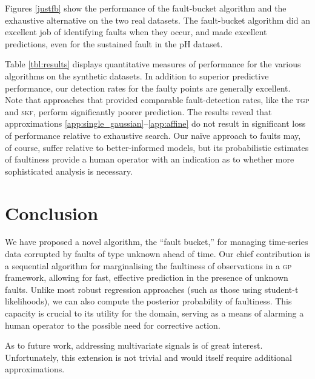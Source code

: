 \documentclass[letterpaper]{article}
\newcommand{\acro}[1]{\textsc{\MakeLowercase{#1}}}
\begin{document}


Figures \ref{justfb} show the performance of the
fault-bucket algorithm and the exhaustive alternative on the two real datasets. The fault-bucket algorithm did an excellent
job of identifying faults when they occur, and made excellent
predictions, even for the sustained fault in the pH dataset. 

Table \ref{tbl:results} displays quantitative measures of performance
for the various algorithms on the synthetic
datasets.  
In addition to superior predictive performance, our
detection rates for the faulty points are generally excellent. Note that approaches that provided comparable fault-detection rates, like the \acro{tgp} and \acro{skf}, perform significantly poorer prediction.
The results reveal that approximations \ref{app:single_gaussian}--\ref{app:affine} do not result in significant loss of performance relative to exhaustive search. Our na\"{i}ve approach to faults may, of course, suffer relative to better-informed models, but its probabilistic estimates of faultiness provide a human operator with an indication as to whether more sophisticated analysis is necessary.



\section{Conclusion}
We have proposed a novel algorithm, the ``fault bucket,'' for managing
time-series data corrupted by faults of type unknown ahead of time. Our chief
contribution is a sequential algorithm for marginalising the
faultiness of observations in a \acro{gp} framework, allowing for
fast, effective prediction in the presence of unknown faults. Unlike most robust regression approaches (such as those using student-t likelihoods), we can also compute the posterior probability of faultiness. This capacity is crucial to its utility for the domain, serving as a means of alarming a human operator to the possible need for corrective action. 

As to future work, addressing multivariate signals is of great interest. Unfortunately, this extension is not trivial and would itself require additional approximations. 



\end{document}
